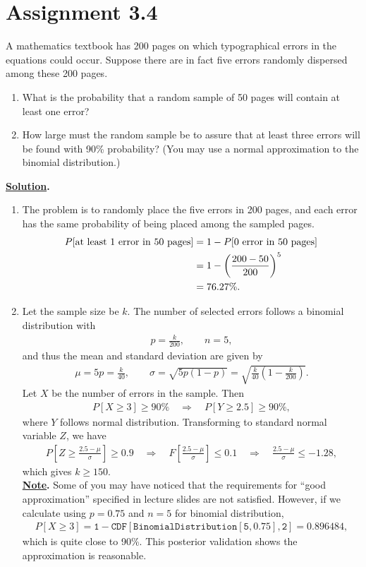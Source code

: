 \section*{Assignment 3.4}

A mathematics textbook has 200 pages on which typographical errors in the equations could occur. Suppose there are in fact five errors randomly dispersed among these 200 pages.
\begin{enumerate}
	\item What is the probability that a random sample of 50 pages will contain at least one error?
	\item How large must the random sample be to assure that at least three errors will be found with 90\% probability? (You may use a normal approximation to the binomial distribution.)
\end{enumerate}
\textbf{\underline{Solution}.}
\begin{enumerate}
	\item The problem is to randomly place the five errors in 200 pages, and each error has the same probability of being placed among the sampled pages.
	\begin{align*}
	P[\mathrm{at\ least\ 1\ error\ in\ 50\ pages}] & = 1 - P[\mathrm{0\ error\ in\ 50\ pages}] \\
	& = 1 - \left(\frac{200-50}{200} \right)^5 \\
	& = 76.27\%.
	\end{align*}
	\item Let the sample size be $k$. The number of selected errors follows a binomial distribution with
	\begin{align*}
	p = \frac{k}{200}, \qquad n = 5,
	\end{align*}
	and thus the mean and standard deviation are given by
	\begin{align*}
	\mu = 5p = \frac{k}{40}, \qquad \sigma = \sqrt{5p(1-p)} = \sqrt{\frac{k}{40}\left(1 - \frac{k}{200} \right)}.
	\end{align*}
	Let $X$ be the number of errors in the sample. Then
	\begin{align*}
	P[X\geq 3] \geq 90\% \quad\Rightarrow\quad P[Y\geq 2.5] \geq 90\%,
	\end{align*}
	where $Y$ follows normal distribution. Transforming to standard normal variable $Z$, we have
	\begin{align*}
	P\left[Z\geq \frac{2.5-\mu}{\sigma} \right]\geq 0.9 \quad\Rightarrow\quad F\left[\frac{2.5-\mu}{\sigma} \right] \leq 0.1 \quad\Rightarrow \quad \frac{2.5-\mu}{\sigma} \leq -1.28,
	\end{align*}
	which gives $k\geq 150$.\\
	\textbf{\underline{Note}.} Some of you may have noticed that the requirements for ``good approximation'' specified in lecture slides are not satisfied. However, if we calculate using $p = 0.75$ and $n = 5$ for binomial distribution,
	\begin{align*}
	P[X\geq 3] = \mathtt{1 - CDF[BinomialDistribution[5, 0.75], 2]} = 0.896484,
	\end{align*}
	which is quite close to 90\%. This posterior validation shows the approximation is reasonable.
\end{enumerate}
